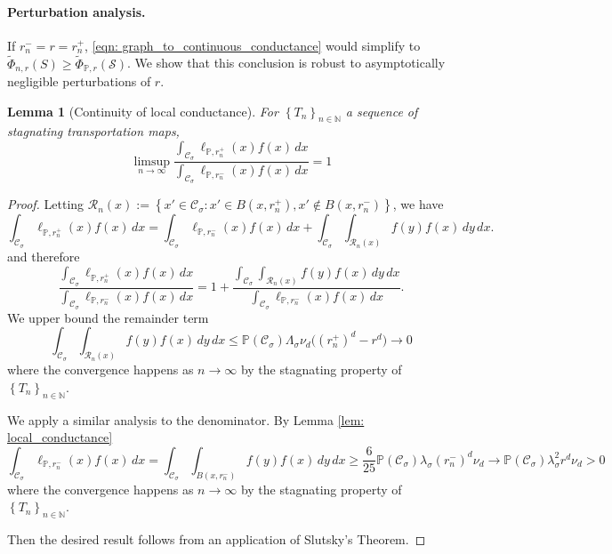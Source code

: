 \documentclass{article}
\newcommand{\set}[1]{\left\{#1\right\}}
\newcommand{\seq}[1]{\left\{#1\right\}_{n \in \mathbb{N}}}
\newcommand{\1}{\mathbf{1}}
\newcommand{\Pbb}{\mathbb{P}}
\newcommand{\Sset}{\mathcal{S}}
\newcommand{\Cset}{\mathcal{C}}
\newcommand{\Csig}{\Cset_{\sigma}}
\newcommand{\dx}{\,dx}
\newcommand{\dy}{\,dy}
\theoremstyle{aldenthm}
\newtheorem{lemma}{Lemma}
\theoremstyle{aldenrmrk}
\begin{document}
\paragraph{Perturbation analysis.}

If $r_n^- = r = r_n^+$, \eqref{eqn: graph_to_continuous_conductance} would simplify to $\widetilde{\Phi}_{n,r}(S) \geq \widetilde{\Phi}_{\Pbb,r}(\Sset)$. We show that this conclusion is robust to asymptotically negligible perturbations of $r$.

\begin{lemma}[Continuity of local conductance]
	\label{lem: cont_local_conductance}
	For $\seq{T_n}$ a sequence of stagnating transportation maps,
	\begin{equation*}
	\limsup_{n \to \infty} \frac{\int_{\Csig} \ell_{\Pbb,r_n^+}(x) f(x) \dx}{\int_{\Csig} \ell_{\Pbb,r_n^-}(x) f(x) \dx} = 1
	\end{equation*}
\end{lemma}
\begin{proof}
	Letting $\mathcal{R}_n(x) := \set{x' \in \Csig: x' \in B(x,r_n^+), x' \not\in B(x,r_n^-)}$, we have
	\begin{equation*}
	\int_{\Csig} \ell_{\Pbb,r_n^+}(x) f(x) \dx = \int_{\Csig} \ell_{\Pbb,r_n^-}(x) f(x) \dx + \int_{\Csig} \int_{\mathcal{R}_n(x)} f(y) f(x) \dy \dx.
	\end{equation*}
	and therefore
	\begin{equation*}
	\frac{\int_{\Csig} \ell_{\Pbb,r_n^+}(x) f(x) \dx}{\int_{\Csig} \ell_{\Pbb,r_n^-}(x) f(x) \dx} = 1 + \frac{\int_{\Csig} \int_{\mathcal{R}_n(x)} f(y) f(x) \dy \dx}{\int_{\Csig} \ell_{\Pbb,r_n^-}(x) f(x) \dx}. 
	\end{equation*}
	We upper bound the remainder term
	\begin{equation*}
	\int_{\Csig} \int_{\mathcal{R}_n(x)} f(y) f(x) \dy \dx \leq \Pbb(\Csig) \Lambda_{\sigma} \nu_d \bigl((r_n^+)^d - r^d) \to 0
	\end{equation*}
	where the convergence happens as $n \to \infty$ by the stagnating property of $\seq{T_n}$. 
	
	We apply a similar analysis to the denominator. By Lemma \ref{lem: local_conductance}
	\begin{equation*}
	\int_{\Csig} \ell_{\Pbb,r_n^-}(x) f(x) \dx = \int_{\Csig} \int_{B(x,r_n^-)} f(y) f(x) \dy \dx \geq \frac{6}{25} \Pbb(\Csig) \lambda_{\sigma} (r_n^{-})^d \nu_d \to \Pbb(\Csig) \lambda_{\sigma}^2 r^d \nu_d > 0
	\end{equation*}
	where the convergence happens as $n \to \infty$ by the stagnating property of $\seq{T_n}$. 
	
	Then the desired result follows from an application of Slutsky's Theorem.
\end{proof}
\end{document}
